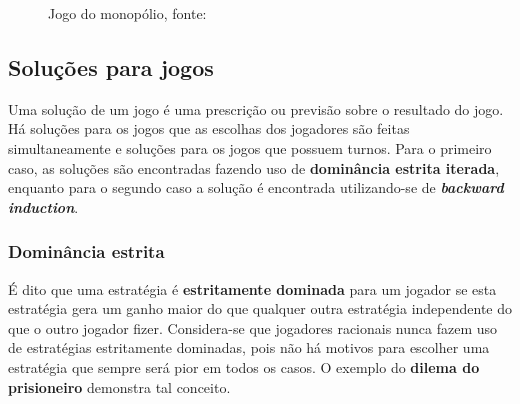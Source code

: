 \begin{figure}
	\centering
	\caption{Jogo do monopólio, fonte: \cite{spaniel_2011}}
	\label{fig:jogo-do-monopolio}
\end{figure}

\subsection{Soluções para jogos}
Uma solução de um jogo é uma prescrição ou previsão sobre o resultado do jogo. Há soluções para os jogos que as escolhas dos jogadores são feitas simultaneamente e soluções para os jogos que possuem turnos. Para o primeiro caso, as soluções são encontradas fazendo uso de \textbf{dominância estrita iterada}, enquanto para o segundo caso a solução é encontrada utilizando-se de \textbf{\emph{backward induction}}.

\subsubsection{Dominância estrita}

É dito que uma estratégia é {\bfseries estritamente dominada} para um jogador se esta estratégia gera um ganho maior do que qualquer outra estratégia independente do que o outro jogador fizer. Considera-se que jogadores racionais nunca fazem uso de estratégias estritamente dominadas, pois não há motivos para escolher uma estratégia que sempre será pior em todos os casos. O exemplo do {\bfseries dilema do prisioneiro} demonstra tal conceito.

